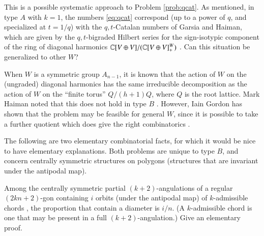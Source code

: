 \documentclass[12pt,letterpaper, reqno]{aimpl}
\begin{document}
\begin{problemblock}

\begin{problem}[2.2]
 This is a possible systematic approach to Problem \ref{prob:qcat}. As mentioned, in type $A$ with $k=1$, the numbers \eqref{eq:qcat} correspond (up to a power of $q$, and specialized at $t=1/q$) with the $q,t$-Catalan numbers of Garsia and Haiman, which are given by the $q,t$-bigraded Hilbert series for the sign-isotypic component of the ring of diagonal harmonics $\mathbb C[V\oplus V]/(\mathbb C[V\oplus V]_+^W)$ \cite{haiman}. Can this situation be generalized to other $W$?
\end{problem}

When $W$ is a symmetric group $A_{n-1}$, it is known that the action of $W$ on the (ungraded) diagonal harmonics has the same irreducible decomposition as the action of $W$ on the ``finite torus'' $Q/(h+1)Q$, where $Q$ is the root lattice. Mark Haiman noted that this does not hold in type $B$ \cite{haiman}. However, Iain Gordon has shown that the problem may be feasible for general $W$, since it is possible to take a further quotient which does give the right combinatorics \cite{gordon}.

\end{problemblock}

\begin{problemblock}
 The following are two elementary combinatorial facts, for which it would be nice to have elementary explanations. Both problems are unique to type $B$, and concern centrally symmetric structures on polygons (structures that are invariant under the antipodal map).

\begin{problem}[2.3]
 Among the centrally symmetric partial $(k+2)$-angulations of a regular $(2kn+2)$-gon containing $i$ orbits (under the antipodal map) of $k$-admissible chords \cite{fomin-reading,tzanaki}, the proportion that contain a diameter is $i/n$. (A $k$-admissible chord is one that may be present in a full $(k+2)$-angulation.) Give an elementary proof.
\end{problem}
\end{problemblock}
\end{document}
